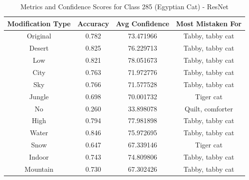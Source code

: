 \begin{table}
	\centering
	\begin{tabular}{|c|c|c|c|}
		\hline
		\textbf{Modification Type} & \textbf{Accuracy} & \textbf{Avg Confidence} & \textbf{Most Mistaken For} \\
		\hline
		Original & 0.782 & 73.471966 & Tabby, tabby cat \\
		\hline
		Desert & 0.825 & 76.229713 & Tabby, tabby cat \\
		\hline
		Low & 0.821 & 78.051673 & Tabby, tabby cat \\
		\hline
		City & 0.763 & 71.972776 & Tabby, tabby cat \\
		\hline
		Sky & 0.766 & 71.577528 & Tabby, tabby cat \\
		\hline
		Jungle & 0.698 & 70.001732 & Tiger cat \\
		\hline
		No & 0.260 & 33.898078 & Quilt, comforter \\
		\hline
		High & 0.794 & 77.981898 & Tabby, tabby cat \\
		\hline
		Water & 0.846 & 75.972695 & Tabby, tabby cat \\
		\hline
		Snow & 0.647 & 67.339146 & Tiger cat \\
		\hline
		Indoor & 0.743 & 74.809806 & Tabby, tabby cat \\
		\hline
		Mountain & 0.730 & 67.302426 & Tabby, tabby cat \\
		\hline
	\end{tabular}
	\caption{Metrics and Confidence Scores for Class 285 (Egyptian Cat) - ResNet}
	\label{tab:metrics_confidence_class_285_resnet}
\end{table}


